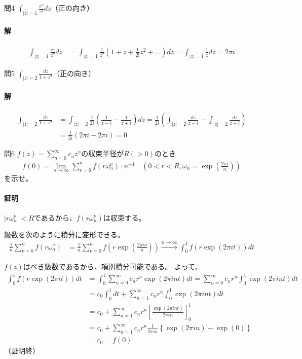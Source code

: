 \begin{mysimplebox}{問4}
   $\int_{|z|=1}\frac{e^z}{z^2}dz$（正の向き）
\end{mysimplebox}
\paragraph{解}
\begin{align*}
   \int_{|z|=1}\frac{e^z}{z^2}dz
   &=\int_{|z|=1}\frac{1}{z^2}\left(1+z+\frac{1}{2!}z^2+\dots\right)dz
   =\int_{|z|=1}\frac{1}{z}dz=2\pi i
\end{align*}

\begin{mysimplebox}{問5}
   $\int_{|z|=2}\frac{dz}{1+z^2}$（正の向き）
\end{mysimplebox}
\paragraph{解}
\begin{align*}
   \int_{|z|=2}\frac{dz}{1+z^2}
   &=\int_{|z|=2}\frac{1}{2i}\left(\frac{1}{z-i}-\frac{1}{z+i}\right)dz
   =\frac{1}{2i}\left(\int_{|z|=2}\frac{dz}{z-i}-\int_{|z|=2}\frac{dz}{z+i}\right)\\
   &=\frac{1}{2i}(2\pi i-2\pi i)=0
\end{align*}

\begin{mysimplebox}{問6}
   $f(z)=\sum_{n=0}^{\infty}c_nz^n$の収束半径が$R(>0)$のとき
   \begin{align*}
      f(0)=\lim_{n\to\infty}\sum_{\nu=0}^{n}f(r\omega_n^\nu)\cdot n^{-1}\quad\left(0<r<R, \omega_n=\exp\left(\frac{2\pi i}{n}\right)\right)
   \end{align*}
   を示せ。
\end{mysimplebox}
\paragraph{証明}
$|r\omega_n^\nu|<R$であるから、$f(r\omega_n^\nu)$は収束する。

級数を次のように積分に変形できる。
\begin{align*}
   \frac{1}{n}\sum_{\nu=0}^{n}f(r\omega_n^\nu)
   &=\frac{1}{n}\sum_{\nu=0}^{n}f\left(r\exp\left(\frac{2\pi i\nu}{n}\right)\right)
   \overset{n\longrightarrow\infty}{\longrightarrow}
   \int_{0}^{1}f(r\exp(2\pi it))dt
\end{align*}

$f(z)$はべき級数であるから、項別積分可能である。
よって、
\begin{align*}
   \int_{0}^{1}f(r\exp(2\pi it))dt
   &=\int_{0}^{1}\sum_{n=0}^{\infty}c_nr^n\exp(2\pi int)dt
   =\sum_{n=0}^{\infty}c_nr^n\int_{0}^{1}\exp(2\pi int)dt\\
   &=c_0\int_{0}^{1}dt+\sum_{n=1}^{\infty}c_nr^n\int_{0}^{1}\exp(2\pi int)dt\\
   &=c_0+\sum_{n=1}^{\infty}c_nr^n\left[\frac{\exp(2\pi int)}{2\pi in}\right]_0^1\\
   &=c_0+\sum_{n=1}^{\infty}c_nr^n\frac{1}{2\pi in}\left\{\exp(2\pi in)-\exp(0)\right\}\\
   &=c_0=f(0)
\end{align*}
（証明終）

